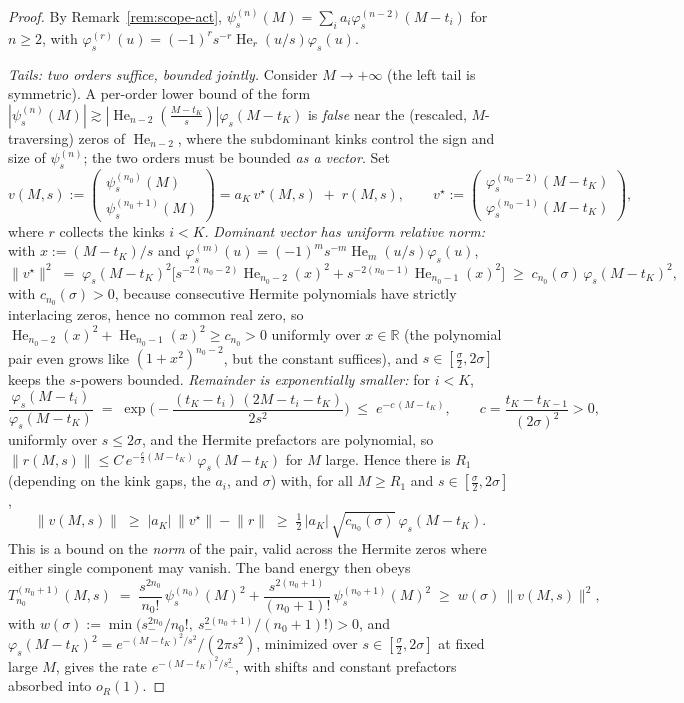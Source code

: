 \documentclass[11pt]{article}
\theoremstyle{remark}
\newcommand{\R}{\mathbb{R}}
\newcommand{\He}{\operatorname{He}}
\begin{document}
\begin{proof}
By Remark~\ref{rem:scope-act}, $\psi_s^{(n)}(M) = \sum_i a_i\varphi_s^{(n-2)}(M - t_i)$ for $n \ge 2$, with $\varphi_s^{(r)}(u) = (-1)^r s^{-r}\He_r(u/s)\varphi_s(u)$.

\emph{Tails: two orders suffice, bounded jointly.} Consider $M \to +\infty$ (the left tail is symmetric). A per-order lower bound of the form $|\psi_s^{(n)}(M)| \gtrsim |\He_{n-2}(\frac{M-t_K}{s})|\varphi_s(M-t_K)$ is \emph{false} near the (rescaled, $M$-traversing) zeros of $\He_{n-2}$, where the subdominant kinks control the sign and size of $\psi_s^{(n)}$; the two orders must be bounded \emph{as a vector}. Set
\[
v(M,s) := \begin{pmatrix}\psi_s^{(n_0)}(M)\\[2pt] \psi_s^{(n_0+1)}(M)\end{pmatrix}
= a_K\, v^\star(M,s) \;+\; r(M,s),
\qquad
v^\star := \begin{pmatrix}\varphi_s^{(n_0-2)}(M - t_K)\\[2pt] \varphi_s^{(n_0-1)}(M - t_K)\end{pmatrix},
\]
where $r$ collects the kinks $i < K$. \emph{Dominant vector has uniform relative norm:} with $x := (M-t_K)/s$ and $\varphi_s^{(m)}(u) = (-1)^m s^{-m}\He_m(u/s)\varphi_s(u)$,
\[
\lVert v^\star\rVert^2 \;=\; \varphi_s(M-t_K)^2\Big[s^{-2(n_0-2)}\He_{n_0-2}(x)^2 + s^{-2(n_0-1)}\He_{n_0-1}(x)^2\Big]
\;\ge\; c_{n_0}(\sigma)\,\varphi_s(M-t_K)^2 ,
\]
with $c_{n_0}(\sigma) > 0$, because consecutive Hermite polynomials have strictly interlacing zeros, hence no common real zero, so $\He_{n_0-2}(x)^2 + \He_{n_0-1}(x)^2 \ge c_{n_0} > 0$ uniformly over $x \in \R$ (the polynomial pair even grows like $(1+x^2)^{n_0-2}$, but the constant suffices), and $s \in [\tfrac\sigma2, 2\sigma]$ keeps the $s$-powers bounded. \emph{Remainder is exponentially smaller:} for $i < K$,
\[
\frac{\varphi_s(M - t_i)}{\varphi_s(M - t_K)} \;=\; \exp\!\Big(-\frac{(t_K - t_i)\,(2M - t_i - t_K)}{2s^2}\Big) \;\le\; e^{-c\,(M - t_K)},
\qquad c = \frac{t_K - t_{K-1}}{(2\sigma)^2} > 0,
\]
uniformly over $s \le 2\sigma$, and the Hermite prefactors are polynomial, so $\lVert r(M,s)\rVert \le C\,e^{-\frac c2(M - t_K)}\,\varphi_s(M-t_K)$ for $M$ large. Hence there is $R_1$ (depending on the kink gaps, the $a_i$, and $\sigma$) with, for all $M \ge R_1$ and $s \in [\tfrac\sigma2, 2\sigma]$,
\[
\lVert v(M,s)\rVert \;\ge\; |a_K|\,\lVert v^\star\rVert - \lVert r\rVert \;\ge\; \tfrac12\,|a_K|\,\sqrt{c_{n_0}(\sigma)}\ \varphi_s(M - t_K) .
\]
This is a bound on the \emph{norm} of the pair, valid across the Hermite zeros where either single component may vanish. The band energy then obeys
\[
T^{(n_0+1)}_{n_0}(M,s) \;=\; \frac{s^{2n_0}}{n_0!}\,\psi_s^{(n_0)}(M)^2 + \frac{s^{2(n_0+1)}}{(n_0+1)!}\,\psi_s^{(n_0+1)}(M)^2
\;\ge\; w(\sigma)\,\lVert v(M,s)\rVert^2 ,
\]
with $w(\sigma) := \min\big(s_-^{2n_0}/n_0!,\ s_-^{2(n_0+1)}/(n_0{+}1)!\big) > 0$, and $\varphi_s(M-t_K)^2 = e^{-(M-t_K)^2/s^2}/(2\pi s^2)$, minimized over $s \in [\tfrac\sigma2, 2\sigma]$ at fixed large $M$, gives the rate $e^{-(M-t_K)^2/s_-^2}$, with shifts and constant prefactors absorbed into $o_R(1)$.


\end{proof}
\end{document}
